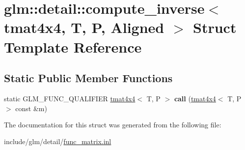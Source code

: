 \hypertarget{structglm_1_1detail_1_1compute__inverse_3_01tmat4x4_00_01T_00_01P_00_01Aligned_01_4}{}\section{glm\+:\+:detail\+:\+:compute\+\_\+inverse$<$ tmat4x4, T, P, Aligned $>$ Struct Template Reference}
\label{structglm_1_1detail_1_1compute__inverse_3_01tmat4x4_00_01T_00_01P_00_01Aligned_01_4}
\subsection*{Static Public Member Functions}
\begin{DoxyCompactItemize}
\item 
\mbox{\label{structglm_1_1detail_1_1compute__inverse_3_01tmat4x4_00_01T_00_01P_00_01Aligned_01_4_a79c42e7b3559a548ea78b8529611745d}} 
static G\+L\+M\+\_\+\+F\+U\+N\+C\+\_\+\+Q\+U\+A\+L\+I\+F\+I\+ER \hyperlink{structglm_1_1tmat4x4}{tmat4x4}$<$ T, P $>$ {\bfseries call} (\hyperlink{structglm_1_1tmat4x4}{tmat4x4}$<$ T, P $>$ const \&m)
\end{DoxyCompactItemize}


The documentation for this struct was generated from the following file\+:\begin{DoxyCompactItemize}
\item 
include/glm/detail/\hyperlink{func__matrix_8inl}{func\+\_\+matrix.\+inl}\end{DoxyCompactItemize}
